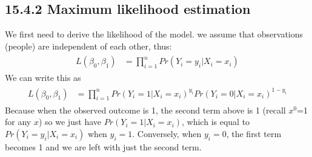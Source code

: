 \documentclass[letterpaper,10pt,english]{jupyterBook}
\begin{document}
\subsection{15.4.2 Maximum likelihood estimation}
\label{\detokenize{15.e. Logistic Regression:maximum-likelihood-estimation}}
\sphinxAtStartPar
We first need to derive the likelihood of the model. we assume that observations (people) are independent of each other, thus:
\begin{equation*}
\begin{split}
\begin{align*}
L(\beta_0, \beta_1) &= \prod_{i=1}^n Pr(Y_i = y_i|X_i=x_i) 
\end{align*}
\end{split}
\end{equation*}
\sphinxAtStartPar
We can write this as
\begin{equation*}
\begin{split}
\begin{align*}
L(\beta_0, \beta_1) &= \prod_{i=1}^n Pr(Y_i = 1 | X_i = x_i)^{y_i}Pr(Y_i = 0 | X_i = x_i)^{1-y_i}
\end{align*}
\end{split}
\end{equation*}
\sphinxAtStartPar
Because when the observed outcome is 1, the second term above is 1 (recall \(x^0\)=1 for any \(x\)) so we just have \(Pr(Y_i = 1|X_i=x_i)\), which is equal to \(Pr(Y_i = y_i|X_i=x_i)\) when \(y_i = 1\). Conversely, when \(y_i = 0\), the first term becomes 1 and we are left with just the second term.
\end{document}
